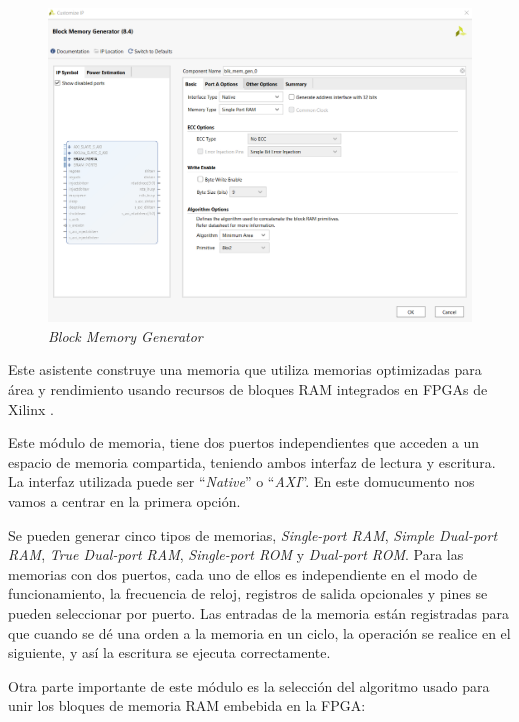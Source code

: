 \begin{figure}[H]
    \centering
    \includegraphics[width = 1\textwidth]{imagenes/blockmemory.PNG}
    \caption{\textit{Block Memory Generator}}\label{memoria}
\end{figure}

Este asistente construye una memoria que utiliza memorias optimizadas para área y rendimiento usando recursos 
de bloques RAM integrados en FPGAs de Xilinx \cite{memoria}.

Este módulo de memoria, tiene dos puertos independientes que acceden a un espacio de memoria compartida, teniendo ambos 
interfaz de lectura y escritura. La interfaz utilizada puede ser ``\textit{Native}'' o ``\textit{AXI}''. En este domucumento nos vamos a 
centrar en la primera opción. 

Se pueden generar cinco tipos de memorias, \textit{Single-port RAM}, \textit{Simple Dual-port RAM}, 
\textit{True Dual-port RAM}, \textit{Single-port ROM} y \textit{Dual-port ROM}. Para las memorias con 
dos puertos, cada uno de ellos es independiente en el modo de funcionamiento, la frecuencia 
de reloj, registros de salida opcionales y pines se pueden seleccionar por puerto. Las entradas de la memoria están registradas 
para que cuando se dé una orden a la memoria en un ciclo, la operación se realice en el siguiente, y así la escritura se ejecuta correctamente.

Otra parte importante de este módulo es la selección del algoritmo usado para unir los bloques de memoria RAM embebida en la FPGA:


